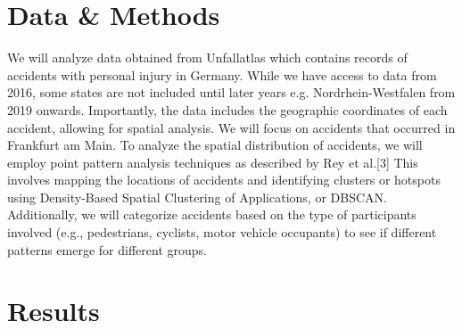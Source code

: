 \documentclass[10pt,a4paper]{article} %
\begin{document}
\section*{Data \& Methods}
We will analyze data obtained from Unfallatlas which contains records of accidents with personal injury in Germany. While we have access to data from 2016, some states are not included until later years e.g. Nordrhein-Westfalen from 2019 onwards. Importantly, the data includes the geographic coordinates of each accident, allowing for spatial analysis. We will focus on accidents that occurred in Frankfurt am Main. To analyze the spatial distribution of accidents, we will employ point pattern analysis techniques as described by Rey et al.[3] This involves mapping the locations of accidents and identifying clusters or hotspots using Density-Based Spatial Clustering of Applications, or DBSCAN\@. Additionally, we will categorize accidents based on the type of participants involved (e.g., pedestrians, cyclists, motor vehicle occupants) to see if different patterns emerge for different groups.

\section*{Results}




\lipsum[1]\\
\lipsum[2]\\

\end{document}

